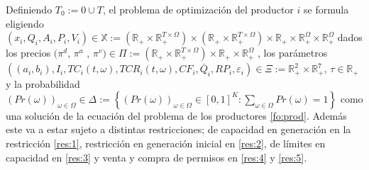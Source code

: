 Definiendo $T_0:={0}\cup T$, el problema de optimización del productor $i$ se formula eligiendo \linebreak$(x_i,Q_i, A_i,P_i,V_i)\in\mathbb{X}:=\left(\mathbb{R}_+\times\mathbb{R}_+^{T\times\Omega}\right) \times\left(\mathbb{R}_+\times\mathbb{R}_+^{T\times\Omega}\right) \times \mathbb{R}_+\times\mathbb{R}_+^{\Omega}\times\mathbb{R}_+^{\Omega}$ dados los precios \linebreak$(\pi^d$, $\pi^a$ , $\pi^v)\in\Pi:=\left(\mathbb{R}_+\times\mathbb{R}_+^{T\times\Omega}\right)\times\mathbb{R}_+\times\mathbb{R}^{\Omega}_+$ , los parámetros \linebreak$\left((a_i,b_i),I_i, TC_i(t,\omega), TCR_i(t,\omega), CF_i,\bar{Q}_i, RP_i , \varepsilon_i\right)\in \Xi:=\mathbb{R}_+^2\times\mathbb{R}_+^7$, $\tau\in \mathbb{R}_+$ y la probabilidad $(Pr(\omega))_{\omega\in\Omega}\in\Delta:=\left\{\left(Pr(\omega)\right)_{\omega\in\Omega}\in[0,1]^K:\sum_{\omega\in\Omega}Pr(\omega)=1\right\}$ como una solución de la ecuación del problema de los productores \ref{fo:prod}. Además este va a estar sujeto a distintas restricciones; de capacidad en generación en la restricción \ref{res:1}, restricción en generación inicial en \ref{res:2}, de límites en capacidad en \ref{res:3} y venta y compra de permisos en \ref{res:4} y \ref{res:5}.


